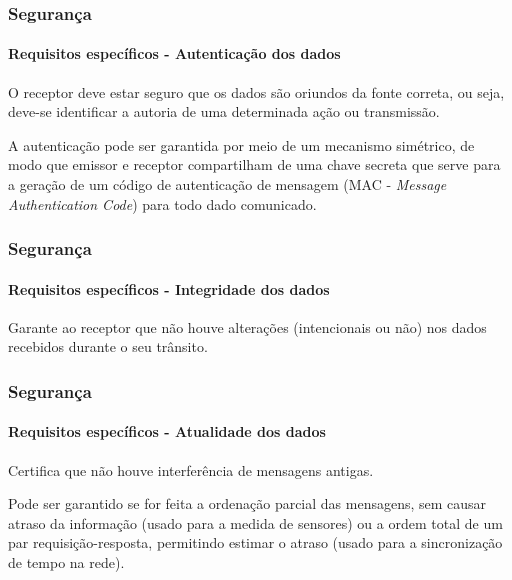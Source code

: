\documentclass[notes]{beamer}
\begin{document}
\begin{frame}
\label{slide_67}
\frametitle{Segurança}
\framesubtitle{Requisitos específicos - Autenticação dos dados}

\begin{block}

O receptor deve estar seguro que os dados são oriundos da fonte correta, ou seja, deve-se identificar a autoria de uma determinada ação ou transmissão. 

\end{block} \pause

\begin{block}

A autenticação pode ser garantida por meio de um mecanismo simétrico, de modo que emissor e receptor compartilham de uma chave secreta que serve para a geração de um código de autenticação de mensagem (MAC - \textit{Message Authentication Code}) para todo dado comunicado.

\end{block} 

\end{frame}

\begin{frame}
\label{slide_68}
\frametitle{Segurança}
\framesubtitle{Requisitos específicos - Integridade dos dados}

\begin{block}

Garante ao receptor que não houve alterações (intencionais ou não) nos dados recebidos durante o seu trânsito. 

\end{block} 

\end{frame}

\begin{frame}
\label{slide_69}
\frametitle{Segurança}
\framesubtitle{Requisitos específicos - Atualidade dos dados}

\begin{block}

Certifica que não houve interferência de mensagens antigas.

\end{block} \pause

\begin{block}

Pode ser garantido se for feita a ordenação parcial das mensagens, sem causar atraso da informação (usado para a medida de sensores) ou a ordem total de um par requisição-resposta, permitindo estimar o atraso (usado para a sincronização de tempo na rede).  

\end{block} 

\end{frame}
\end{document}
